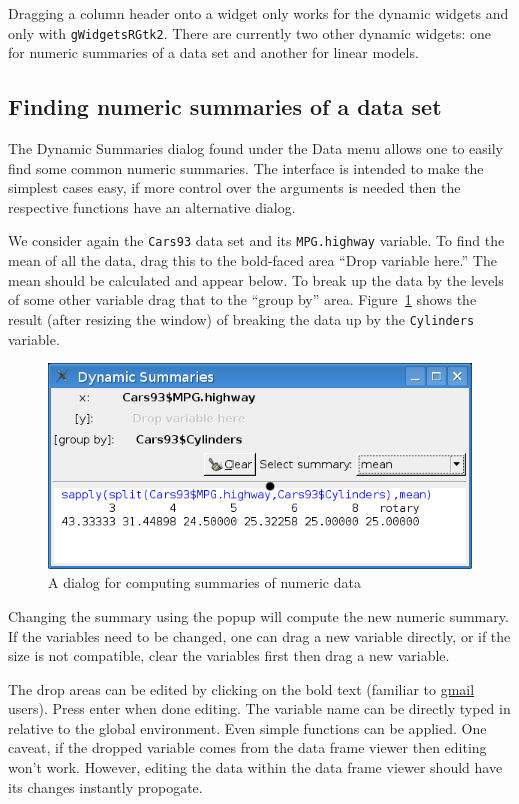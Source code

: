 \documentclass[12pt]{article}
\newcommand{\RCode}[1]{\texttt{#1}}
\begin{document}
Dragging a column header onto a widget only works for the dynamic
widgets and only with \RCode{gWidgetsRGtk2}. There are currently two
other dynamic widgets: one for numeric summaries of a data set and
another for linear models.

\subsection{Finding numeric summaries of a data set}
\label{sec:numeric-summaries}

The Dynamic Summaries dialog found under the Data menu allows one to
easily find some common numeric summaries. The interface is intended
to make the simplest cases easy, if more control over the arguments is
needed then the respective functions have an alternative dialog.

We consider again the \RCode{Cars93} data set and its
\RCode{MPG.highway} variable. To find the mean of all the data, drag
this to the bold-faced area ``Drop variable here.'' The mean should be
calculated and appear below. To break up the data by the levels of
some other variable drag that to the ``group by''
area. Figure~\ref{fig:dynamic-summaries} shows the result (after
resizing the window) of breaking the data up by the \RCode{Cylinders}
variable.

\begin{figure}[htbp]
  \centering
  \includegraphics[width=.7\textwidth]{dynamic-summaries}
  \caption{A dialog for computing summaries of numeric data}
  \label{fig:dynamic-summaries}
\end{figure}

Changing the summary using the popup will compute the new numeric
summary. If the variables need to be changed, one can drag a new
variable directly, or if the size is not compatible, clear the
variables first then drag a new variable.

The drop areas can be edited by clicking on the bold text (familiar to
\url{gmail} users). Press enter when done editing. The variable name
can be directly typed in relative to the global environment. Even
simple functions can be applied. One caveat, if the dropped variable
comes from the data frame viewer then editing won't work. However,
editing the data within the data frame viewer should have its changes
instantly propogate.
\end{document}
